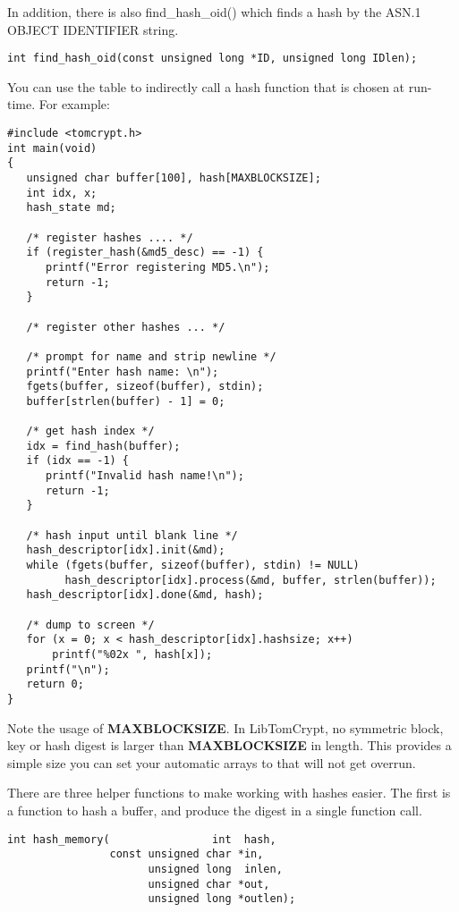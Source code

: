 \documentclass[synpaper]{book}
\begin{document}
In addition, there is also find\_hash\_oid() which finds a hash by the ASN.1 OBJECT IDENTIFIER string.
\begin{verbatim}
int find_hash_oid(const unsigned long *ID, unsigned long IDlen);
\end{verbatim}

You can use the table to indirectly call a hash function that is chosen at run-time.  For example:
\begin{small}
\begin{verbatim}
#include <tomcrypt.h>
int main(void)
{
   unsigned char buffer[100], hash[MAXBLOCKSIZE];
   int idx, x;
   hash_state md;

   /* register hashes .... */
   if (register_hash(&md5_desc) == -1) {
      printf("Error registering MD5.\n");
      return -1;
   }

   /* register other hashes ... */

   /* prompt for name and strip newline */
   printf("Enter hash name: \n");
   fgets(buffer, sizeof(buffer), stdin);
   buffer[strlen(buffer) - 1] = 0;

   /* get hash index */
   idx = find_hash(buffer);
   if (idx == -1) {
      printf("Invalid hash name!\n");
      return -1;
   }

   /* hash input until blank line */
   hash_descriptor[idx].init(&md);
   while (fgets(buffer, sizeof(buffer), stdin) != NULL)
         hash_descriptor[idx].process(&md, buffer, strlen(buffer));
   hash_descriptor[idx].done(&md, hash);

   /* dump to screen */
   for (x = 0; x < hash_descriptor[idx].hashsize; x++)
       printf("%02x ", hash[x]);
   printf("\n");
   return 0;
}
\end{verbatim}
\end{small}

Note the usage of \textbf{MAXBLOCKSIZE}.  In LibTomCrypt, no symmetric block, key or hash digest is larger than \textbf{MAXBLOCKSIZE} in
length.  This provides a simple size you can set your automatic arrays to that will not get overrun.

There are three helper functions to make working with hashes easier.  The first is a function to hash a buffer, and produce the digest in a single
function call.

\begin{verbatim}
int hash_memory(                int  hash,
                const unsigned char *in,
                      unsigned long  inlen,
                      unsigned char *out,
                      unsigned long *outlen);
\end{verbatim}
\end{document}
